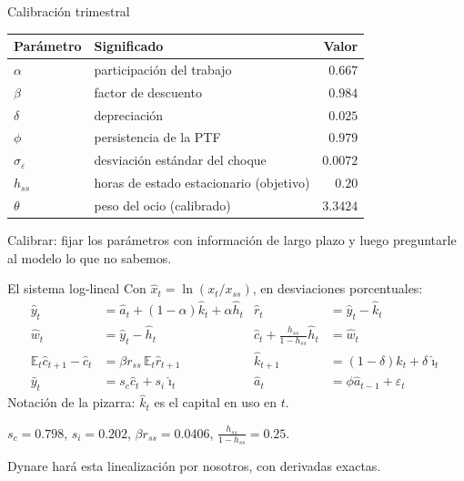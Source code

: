 \begin{frame}[label=calibracion]{Calibración trimestral}
  \centering\small
  \renewcommand{\arraystretch}{1.15}
  \begin{tabular}{@{}llr@{}}
    \toprule
    \textbf{Parámetro} & \textbf{Significado} & \textbf{Valor}\\
    \midrule
    $\alpha$ & participación del trabajo & $0.667$\\
    $\beta$ & factor de descuento & $0.984$\\
    $\delta$ & depreciación & $0.025$\\
    $\phi$ & persistencia de la PTF & $0.979$\\
    $\sigma_\varepsilon$ & desviación estándar del choque & $0.0072$\\
    $h_{ss}$ & horas de estado estacionario (objetivo) & $0.20$\\
    \midrule
    $\theta$ & peso del ocio (calibrado) & $3.3424$\\
    \bottomrule
  \end{tabular}
  \par\vspace{0.2cm}\raggedright\normalsize
  Calibrar: fijar los parámetros con información de largo plazo y luego preguntarle al
  modelo lo que no sabemos.
\end{frame}

\begin{frame}[label=loglineal]{El sistema log-lineal}
  Con $\hat x_t=\ln(x_t/x_{ss})$, en desviaciones porcentuales:
  \small
  \begin{align*}
    \hat y_t&=\hat a_t+(1-\alpha)\hat k_t+\alpha\hat h_t &
    \hat r_t&=\hat y_t-\hat k_t\\
    \hat w_t&=\hat y_t-\hat h_t &
    \hat c_t+\tfrac{h_{ss}}{1-h_{ss}}\hat h_t&=\hat w_t\\
    \mathbb{E}_t\hat c_{t+1}-\hat c_t&=\beta r_{ss}\,\mathbb{E}_t\hat r_{t+1} &
    \hat k_{t+1}&=(1-\delta)\hat k_t+\delta\hat\imath_t\\
    \hat y_t&=s_c\hat c_t+s_i\hat\imath_t &
    \hat a_t&=\phi\hat a_{t-1}+\varepsilon_t
  \end{align*}
  \normalsize
  \vspace{0.1cm}
  Notación de la pizarra: $\hat k_t$ es el capital en uso en $t$.\par
  \vspace{0.2cm}
  $s_c=0.798$, $s_i=0.202$, $\beta r_{ss}=0.0406$, $\tfrac{h_{ss}}{1-h_{ss}}=0.25$.\par
  \vspace{0.25cm}
  Dynare hará esta linealización por nosotros, con derivadas exactas.
\end{frame}

